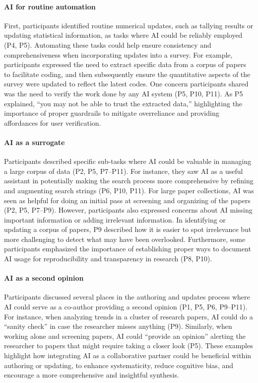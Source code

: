 \paragraph{\textbf{AI for routine automation}} 
First, participants identified routine numerical updates, such as tallying results or updating statistical information, as tasks where AI could be reliably employed (P4, P5). Automating these tasks could help ensure consistency and comprehensiveness when incorporating updates into a survey. For example, participants expressed the need to extract specific data from a corpus of papers to facilitate coding, and then subsequently ensure the quantitative aspects of the survey were updated to reflect the latest codes. One concern participants shared was the need to verify the work done by any AI system (P5, P10, P11). As P5 explained, ``you may not be able to trust the extracted data,'' highlighting the importance of proper guardrails to mitigate overreliance and providing affordances for user verification.

\paragraph{\textbf{AI as a surrogate}}
Participants described specific sub-tasks where AI could be valuable in managing a large corpus of data (P2, P5, P7--P11). For instance, they saw AI as a useful assistant in potentially making the search process more comprehensive by refining and augmenting search strings (P6, P10, P11). For large paper collections, AI was seen as helpful for doing an initial pass at screening and organizing of the papers (P2, P5, P7--P9). However, participants also expressed concerns about AI missing important information or adding irrelevant information. In identifying or updating a corpus of papers, P9 described how it is easier to spot irrelevance but more challenging to detect what may have been overlooked. Furthermore, some participants emphasized the importance of establishing proper ways to document AI usage for reproducibility and transparency in research (P8, P10).

\paragraph{\textbf{AI as a second opinion}}
Participants discussed several places in the authoring and updates process where AI could serve as a co-author providing a second opinion (P1, P5, P6, P9--P11). For instance, when analyzing trends in a cluster of research papers, AI could do a ``sanity check'' in case the researcher misses anything (P9). Similarly, when working alone and screening papers, AI could ``provide an opinion'' alerting the researcher to papers that might require taking a closer look (P5). These examples highlight how integrating AI as a collaborative partner could be beneficial within authoring or updating, to enhance systematicity, reduce cognitive bias, and encourage a more comprehensive and insightful synthesis.
